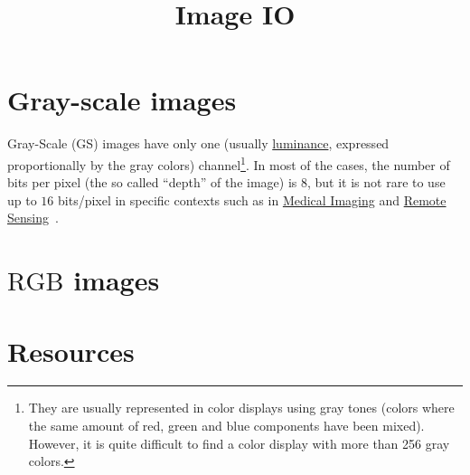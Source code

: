 
\title{Image IO}

\maketitle
\tableofcontents

\section{Gray-scale images}

Gray-Scale (GS) images have only one (usually
\href{https://en.wikipedia.org/wiki/Luminance}{luminance}, expressed
proportionally by the gray colors) channel\footnote{They are usually
represented in color displays using gray tones (colors where the same
amount of red, green and blue components have been mixed). However, it
is quite difficult to find a color display with more than 256 gray
colors.}. In most of the cases, the number of bits per pixel (the so
called ``depth'' of the image) is $8$, but it is not rare to use up to
$16$ bits/pixel in specific contexts such as in
\href{https://en.wikipedia.org/wiki/Medical_imaging}{Medical Imaging}
and \href{https://en.wikipedia.org/wiki/Remote_sensing}{Remote
  Sensing}~\cite{burger2016digital}.

\section{$\text{RGB}$ images}

\section{Resources}

\renewcommand{\addcontentsline}[3]{} %

